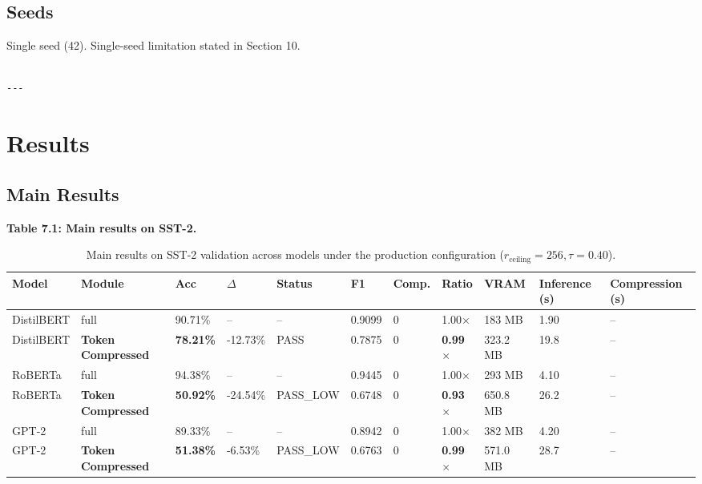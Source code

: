 \subsection{Seeds}

Single seed (42). Single-seed limitation stated in Section 10.
\begin{lstlisting}

---
\end{lstlisting}

\section{Results}

\subsection{Main Results}

\textbf{Table 7.1: Main results on SST-2.}

\begin{table}[t]
\centering
\small
\begin{tabular}{lllllllllll}
\toprule
\textbf{Model} & \textbf{Module} & \textbf{Acc} & \textbf{$\Delta$} & \textbf{Status} & \textbf{F1} & \textbf{Comp.} & \textbf{Ratio} & \textbf{VRAM} & \textbf{Inference (s)} & \textbf{Compression (s)} \\
\midrule
DistilBERT & full & 90.71\% & -- & -- & 0.9099 & 0 & 1.00$\times$ & 183 MB & 1.90 & -- \\
DistilBERT & \textbf{Token Compressed} & \textbf{78.21\%} & -12.73\% & PASS & 0.7875 & 0 & \textbf{0.99$\times$} & 323.2 MB & 19.8 & -- \\
RoBERTa & full & 94.38\% & -- & -- & 0.9445 & 0 & 1.00$\times$ & 293 MB & 4.10 & -- \\
RoBERTa & \textbf{Token Compressed} & \textbf{50.92\%} & -24.54\% & PASS\_LOW & 0.6748 & 0 & \textbf{0.93$\times$} & 650.8 MB & 26.2 & -- \\
GPT-2 & full & 89.33\% & -- & -- & 0.8942 & 0 & 1.00$\times$ & 382 MB & 4.20 & -- \\
GPT-2 & \textbf{Token Compressed} & \textbf{51.38\%} & -6.53\% & PASS\_LOW & 0.6763 & 0 & \textbf{0.99$\times$} & 571.0 MB & 28.7 & -- \\
\bottomrule
\end{tabular}
\caption{Main results on SST-2 validation across models under the production configuration ($r_{\mathrm{ceiling}}=256, \tau=0.40$).}
\label{tab:main_sst2}
\end{table}

